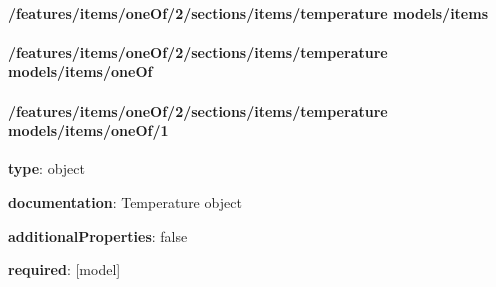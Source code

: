 \begin{itemized}
\paragraph{/features/items/oneOf/2/sections/items/temperature models/items} \begin{itemized}
\end{itemized}\end{itemized}\paragraph{/features/items/oneOf/2/sections/items/temperature models/items/oneOf} \begin{itemized}
\end{itemized}\paragraph{/features/items/oneOf/2/sections/items/temperature models/items/oneOf/1} \begin{itemized}
\item {\bf type}: object
\item {\bf documentation}: Temperature object
\item {\bf additionalProperties}: false
\item {\bf required}: [model]\end{itemized}
